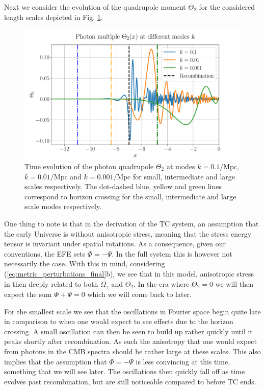 \documentclass[%
reprint,
 amsmath,amssymb,
 aps,
]{revtex4-2}
\begin{document}
Next we consider the evolution of the quadrupole moment $\Theta_2$ for the considered length scales depicted in Fig. \ref{fig:T2}.

\begin{figure}[ht!]
	\includegraphics[width = \linewidth]{Figures/Theta2.pdf}
	\caption{Time evolution of the photon quadrupole $\Theta_2$ at modes $k=0.1/\text{Mpc}$, $k=0.01/\text{Mpc}$ and $k=0.001/\text{Mpc}$ for small, intermediate and large scales respectively. The dot-dashed blue, yellow and green lines correspond to horizon crossing for the small, intermediate and large scale modes respectively.}
	\label{fig:T2}
\end{figure}

One thing to note is that in the derivation of the TC system, an assumption that the early Universe is without anisotropic stress, meaning that the stress energy tensor is invariant under spatial rotations. As a consequence, given our conventions, the EFE sets $\Phi=-\Psi$. In the full system this is however not necessarily the case. With this in mind, considering (\ref{eq:metric_perturbations_final}b), we see that in this model, anisotropic stress in then deeply related to both $\Omega_\gamma$ and $\Theta_2$. In the era where $\Theta_2=0$ we will then expect the sum $\Phi+\Psi=0$ which we will come back to later. 

For the smallest scale we see that the oscillations in Fourier space begin quite late in comparison to when one would expect to see effects due to the horizon crossing. A small oscillation can then be seen to build up rather quickly until it peaks shortly after recombination. As such the anisotropy that one would expect from photons in the CMB spectra should be rather large at these scales. This also implies that the assumption that $\Phi=-\Psi$ is less convincing at this time, something that we will see later. The oscillations then quickly fall off as time evolves past recombination, but are still noticeable compared to before TC ends.
\end{document}
